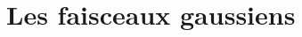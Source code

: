 \documentclass[12pt,fancy]{cours}
\begin{document}








\section{Les faisceaux gaussiens}
\end{document}
